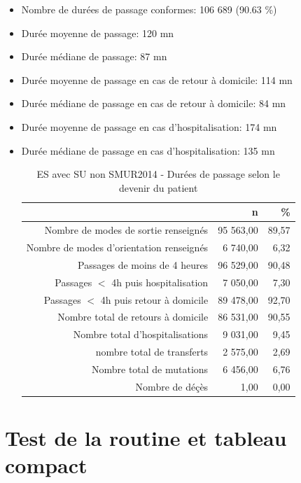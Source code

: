 \documentclass[]{article}
\begin{document}
\begin{itemize}
\itemsep1pt\parskip0pt
\item
  Nombre de durées de passage conformes: 106 689 (90.63 \%)
\item
  Durée moyenne de passage: 120 mn
\item
  Durée médiane de passage: 87 mn
\item
  Durée moyenne de passage en cas de retour à domicile: 114 mn
\item
  Durée médiane de passage en cas de retour à domicile: 84 mn
\item
  Durée moyenne de passage en cas d'hospitalisation: 174 mn
\item
  Durée médiane de passage en cas d'hospitalisation: 135 mn

  \begin{table}[ht]
  \centering
  \begin{tabular}{rrr}
    \hline
   & n & \% \\ 
    \hline
  Nombre de modes de sortie renseignés & 95 563,00 & 89,57 \\ 
    Nombre de modes d'orientation renseignés & 6 740,00 & 6,32 \\ 
    Passages de moins de 4 heures & 96 529,00 & 90,48 \\ 
    Passages $<$ 4h puis hospitalisation & 7 050,00 & 7,30 \\ 
    Passages $<$ 4h puis retour à domicile & 89 478,00 & 92,70 \\ 
    Nombre total de retours à domicile & 86 531,00 & 90,55 \\ 
    Nombre total d'hospitalisations & 9 031,00 & 9,45 \\ 
    nombre total de transferts & 2 575,00 & 2,69 \\ 
    Nombre total de mutations & 6 456,00 & 6,76 \\ 
    Nombre de déçès & 1,00 & 0,00 \\ 
     \hline
  \end{tabular}
  \caption{ES avec SU non SMUR2014 - Durées de passage selon le devenir du patient} 
  \end{table}
\end{itemize}

\section{Test de la routine et tableau
compact}\label{test-de-la-routine-et-tableau-compact}
\end{document}
